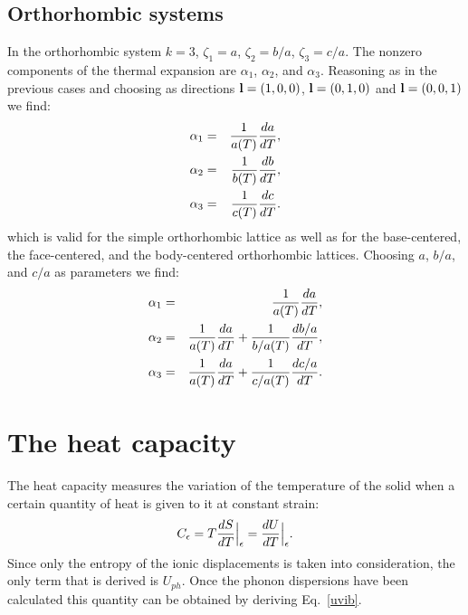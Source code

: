 \documentclass[12pt,a4paper]{article}
\begin{document}
\subsection{\color{web-blue}Orthorhombic systems}
In the orthorhombic system $k=3$, $\zeta_1=a$, $\zeta_2=b/a$, 
$\zeta_3=c/a$. The nonzero components of the thermal expansion are 
$\alpha_{1}$, $\alpha_{2}$, and $\alpha_{3}$. 
Reasoning as in the previous cases and choosing as directions
${\bf l}=(1,0,0)$, ${\bf l}=(0,1,0)$ and ${\bf l}=(0,0,1)$ we find:  
\begin{eqnarray}
\alpha_{1} &=&  {1\over a(T) } {d a \over dT}, \\ 
\alpha_{2} &=&  {1\over b(T) } {d b \over dT}, \\
\alpha_{3} &=&  {1\over c(T) } {d c \over dT}.
\end{eqnarray}
which is valid for the simple orthorhombic lattice as well as for the
base-centered, the face-centered, and the body-centered orthorhombic lattices.
Choosing $a$, $b/a$, and $c/a$ as parameters we find:
\begin{eqnarray}
\alpha_1 &=& {1\over a(T)} {d a \over dT}, \\
\alpha_2 &=& {1\over a(T)} {da \over d T}  + {1\over b/a(T)} {d b/a \over dT}, \\
\alpha_3 &=& {1\over a(T)} {da \over d T}  + {1\over c/a(T)} {d c/a \over dT}.
\end{eqnarray}



\newpage
\section{\color{coral}The heat capacity}
The heat capacity measures the variation of the temperature of the solid
when a certain quantity of heat is given to it at constant strain:
\begin{equation}
C_\epsilon= T {d S \over dT}\Big|_\epsilon = { d U \over d T}\Big|_\epsilon.
\end{equation}
Since only the entropy of the ionic displacements is taken into consideration,
the only term that is derived is $U_{ph}$. Once the phonon dispersions 
have been calculated this quantity can be obtained by deriving Eq.~\ref{uvib}.
\end{document}
